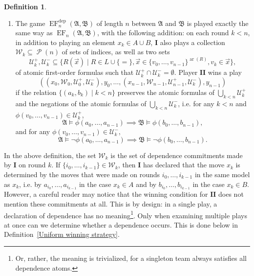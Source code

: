 \documentclass[12pt]{article}
\theoremstyle{definition}
\newtheorem{definition}{Definition}[section]
\newcommand{\wins}{\mathbin{\raisebox{0.8\depth}{$\uparrow$}}}
\newcommand{\playerone}{\mathrm{\mathbf{I}}}
\newcommand{\playertwo}{\mathrm{\mathbf{II}}}
\DeclareMathOperator{\EF}{EF}
\newcommand{\EFdep}{\EF^{\mathrm{dep}}}
\newcommand{\W}{\mathcal W}
\newcommand{\U}{\mathcal U}
\newcommand{\A}{\mathfrak{A}}
\newcommand{\B}{\mathfrak{B}}
\DeclareMathOperator{\ar}{ar}
\DeclareMathOperator{\Pow}{\mathcal{P}}
\begin{document}
\begin{definition}
\begin{enumerate}
        If a player $P$ has a winning strategy in the game, we write
        \[
            P\wins\EF_n(\A,\B).
        \]
        \item The game $\EFdep_n(\A,\B)$ of length $n$ between $\A$ and $\B$ is played exactly the same way as $\EF_n(\A,\B)$, with the following addition: on each round $k<n$, in addition to playing an element $x_k\in A\cup B$, $\playerone$ also plays a collection $\W_k\subseteq\Pow(n)$ of sets of indices, as well as two sets
        \[
            \U^+_k,\U^-_k \subseteq \{ R(\vec x) \mid R\in L\cup\{=\}, \vec x\in\{v_0,\dots,v_{n-1}\}^{\ar(R)}, v_k\in\vec x \},
        \]
        of atomic first-order formulas such that $\U^+_k\cap\U^-_k = \emptyset$.
        Player $\playertwo$ wins a play
        \[
            ((x_0,\W_0,\U^+_0,\U^-_k),y_0,\dots,(x_{n-1},\W_{n-1},\U^+_{n-1},\U^-_k),y_{n-1})
        \]
        if the relation $\{ (a_k, b_k) \mid k<n \}$ preserves the atomic formulas of $\bigcup_{k<n}\U^+_k$ and the negations of the atomic formulas of $\bigcup_{k<n}\U^-_k$, i.e. for any $k<n$ and $\phi(v_0,\dots,v_{n-1})\in\U^+_k$,
        \[
            \A\models\phi(a_0,\dots,a_{n-1}) \implies \B\models\phi(b_0,\dots,b_{n-1}),
        \]
        and for any $\phi(v_0,\dots,v_{n-1})\in\U^-_k$,
        \[
            \A\models\neg\phi(a_0,\dots,a_{n-1}) \implies \B\models\neg\phi(b_0,\dots,b_{n-1}).
        \]
    \end{enumerate}
\end{definition}

In the above definition, the set $\W_k$ is the set of dependence commitments made by $\playerone$ on round $k$. If $\{i_0,\dots,i_{k-1}\}\in\W_k$, then $\playerone$ has declared that the move $x_k$ is determined by the moves that were made on rounds $i_0,\dots,i_{k-1}$ in the same model as $x_k$, i.e. by $a_{i_0},\dots,a_{i_{k-1}}$ in the case $x_k\in A$ and by $b_{i_0},\dots,b_{i_{k-1}}$ in the case $x_k\in B$. However, a careful reader may notice that the winning condition for $\playertwo$ does not mention these commitments at all. This is by design: in a single play, a declaration of dependence has no meaning\footnote{Or, rather, the meaning is trivialized, for a singleton team always satisfies all dependence atoms.}. Only when examining multiple plays at once can we determine whether a dependence occurs. This is done below in Definition~\ref{Uniform winning strategy}.
\end{document}
